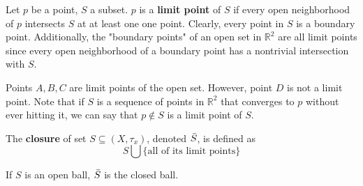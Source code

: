 \documentclass{article}
\begin{document}
    \begin{definition}
    Let $p$ be a point, $S$ a subset. $p$ is a \textbf{limit point} of $S$ if every open neighborhood of $p$ intersects $S$ at at least one one point. Clearly, every point in $S$ is a boundary point. Additionally, the "boundary points" of an open set in $\mathbb{R}^2$ are all limit points since every open neighborhood of a boundary point has a nontrivial intersection with $S$. 

    \begin{center}
    \end{center}
    Points $A, B, C$ are limit points of the open set. However, point $D$ is not a limit point. Note that if $S$ is a sequence of points in $\mathbb{R}^{2}$ that converges to $p$ without ever hitting it, we can say that $p \not\in S$ is a limit point of $S$. 
    \begin{center}
    \end{center}
    \end{definition}

    \begin{definition}
    The \textbf{closure} of set $S \subseteq (X, \tau_{x})$, denoted $\Bar{S}$, is defined as 
    \[ S \bigcup \{\text{all of its limit points}\} \]
    \end{definition}

    \begin{example}
    If $S$ is an open ball, $\Bar{S}$ is the closed ball. 
    \end{example}
\end{document}
